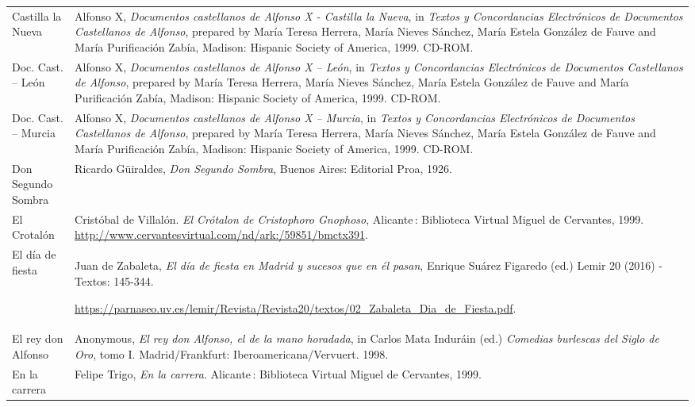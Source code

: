 \begin{tabularx}{\textwidth}{XX}
Castilla la Nueva & Alfonso X, \textit{Documentos castellanos de Alfonso X - Castilla la Nueva}, in \textit{Textos y Concordancias Electrónicos de Documentos Castellanos de Alfonso}, prepared by María Teresa Herrera, María Nieves Sánchez, María Estela González de Fauve and María Purificación Zabía, Madison: Hispanic Society of America, 1999. CD-ROM.\\
Doc. Cast. – León & Alfonso X, \textit{Documentos castellanos de Alfonso X – León}, in \textit{Textos y Concordancias Electrónicos de Documentos Castellanos de Alfonso}, prepared by María Teresa Herrera, María Nieves Sánchez, María Estela González de Fauve and María Purificación Zabía, Madison: Hispanic Society of America, 1999. CD-ROM.\\
Doc. Cast. – Murcia & Alfonso X, \textit{Documentos castellanos de Alfonso X – Murcia}, in \textit{Textos y Concordancias Electrónicos de Documentos Castellanos de Alfonso}, prepared by María Teresa Herrera, María Nieves Sánchez, María Estela González de Fauve and María Purificación Zabía, Madison: Hispanic Society of America, 1999. CD-ROM.\\
Don Segundo Sombra & Ricardo Güiraldes, \textit{Don Segundo Sombra}, Buenos Aires: Editorial Proa, 1926.\\
El Crotalón & Cristóbal de Villalón. \textit{El Crótalon de Cristophoro Gnophoso}, Alicante : Biblioteca Virtual Miguel de Cervantes, 1999. \url{http://www.cervantesvirtual.com/nd/ark:/59851/bmctx391}.\\
El día de fiesta & Juan de Zabaleta, \textit{El día de fiesta en Madrid y sucesos que en él pasan}, Enrique Suárez Figaredo (ed.) Lemir 20 (2016) - Textos: 145-344.

\url{https://parnaseo.uv.es/lemir/Revista/Revista20/textos/02_Zabaleta_Dia_de_Fiesta.pdf}.\\
El rey don Alfonso & Anonymous, \textit{El rey don Alfonso, el de la mano horadada}, in Carlos Mata Induráin (ed.) \textit{Comedias burlescas del Siglo de Oro}, tomo I. Madrid/Frankfurt: Iberoamericana/Vervuert. 1998.\\
En la carrera & Felipe Trigo, \textit{En la carrera}. Alicante : Biblioteca Virtual Miguel de Cervantes, 1999.


\end{tabularx}
